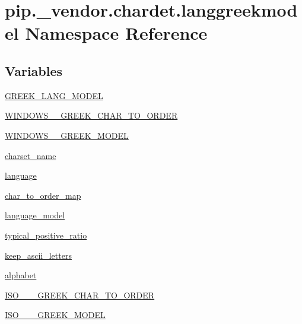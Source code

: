 \hypertarget{namespacepip_1_1__vendor_1_1chardet_1_1langgreekmodel}{}\section{pip.\+\_\+vendor.\+chardet.\+langgreekmodel Namespace Reference}
\label{namespacepip_1_1__vendor_1_1chardet_1_1langgreekmodel}
\subsection*{Variables}
\begin{DoxyCompactItemize}
\item 
\hyperlink{namespacepip_1_1__vendor_1_1chardet_1_1langgreekmodel_a7850839bf33f549d156f4362326abef1}{G\+R\+E\+E\+K\+\_\+\+L\+A\+N\+G\+\_\+\+M\+O\+D\+EL}
\item 
\hyperlink{namespacepip_1_1__vendor_1_1chardet_1_1langgreekmodel_a6ef0eb40d16cff8bb44e529e00fed21e}{W\+I\+N\+D\+O\+W\+S\+\_\+\_\+\+G\+R\+E\+E\+K\+\_\+\+C\+H\+A\+R\+\_\+\+T\+O\+\_\+\+O\+R\+D\+ER}
\item 
\hyperlink{namespacepip_1_1__vendor_1_1chardet_1_1langgreekmodel_a7d17db876bf97441f15bfa3ab2fa3816}{W\+I\+N\+D\+O\+W\+S\+\_\+\_\+\+G\+R\+E\+E\+K\+\_\+\+M\+O\+D\+EL}
\item 
\hyperlink{namespacepip_1_1__vendor_1_1chardet_1_1langgreekmodel_aaea0ec8e5474be2ee53cfd36352dab6b}{charset\+\_\+name}
\item 
\hyperlink{namespacepip_1_1__vendor_1_1chardet_1_1langgreekmodel_a2f74e9bc6defdacb92f3ab337eb826d0}{language}
\item 
\hyperlink{namespacepip_1_1__vendor_1_1chardet_1_1langgreekmodel_a7761b7155c34131b6f0ee9f3a9df7358}{char\+\_\+to\+\_\+order\+\_\+map}
\item 
\hyperlink{namespacepip_1_1__vendor_1_1chardet_1_1langgreekmodel_a35909b22560d79644b5ab3cc9f377d9c}{language\+\_\+model}
\item 
\hyperlink{namespacepip_1_1__vendor_1_1chardet_1_1langgreekmodel_a745bc3f37b6911778fe48e5e87e257ff}{typical\+\_\+positive\+\_\+ratio}
\item 
\hyperlink{namespacepip_1_1__vendor_1_1chardet_1_1langgreekmodel_ad1381f875f38ad627ffa67c17c8c0bbd}{keep\+\_\+ascii\+\_\+letters}
\item 
\hyperlink{namespacepip_1_1__vendor_1_1chardet_1_1langgreekmodel_a3e1d7b6cc8e029a0fb55fd01d035d5c5}{alphabet}
\item 
\hyperlink{namespacepip_1_1__vendor_1_1chardet_1_1langgreekmodel_a139e9bd0f2d6906965d1f98f7ab2c160}{I\+S\+O\+\_\+\_\+\_\+\+G\+R\+E\+E\+K\+\_\+\+C\+H\+A\+R\+\_\+\+T\+O\+\_\+\+O\+R\+D\+ER}
\item 
\hyperlink{namespacepip_1_1__vendor_1_1chardet_1_1langgreekmodel_a50c48308cd85ace3c5e4a19bf0e84815}{I\+S\+O\+\_\+\_\+\_\+\+G\+R\+E\+E\+K\+\_\+\+M\+O\+D\+EL}
\end{DoxyCompactItemize}


